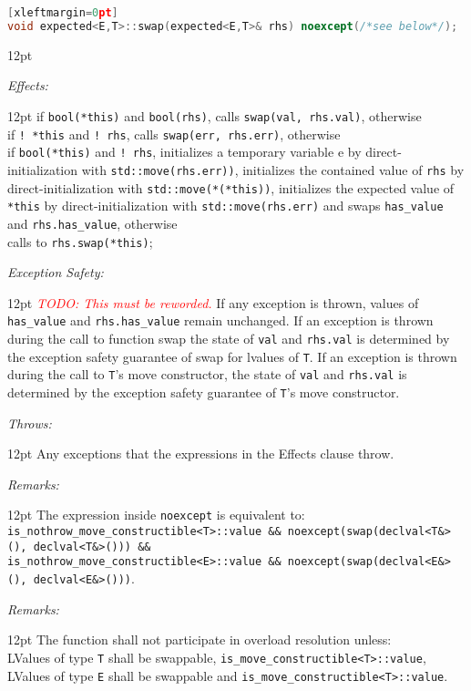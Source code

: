 \documentclass[a4paper,10pt]{article}
\newcommand{\cpp}[1]{\lstinline{#1}}
\newcommand{\todo}[1]{\emph{\textcolor{red}{TODO: #1}}}
\newcommand{\wordingItem}[1]{\noindent\textit{#1:}}
\newenvironment{wordingTextItem}[1]{\wordingItem{#1}\vspace{2pt}\noindent\begin{adjustwidth}{12pt}{}}{\vspace{2pt}\end{adjustwidth}}
\newenvironment{wordingPara}{\begin{adjustwidth}{12pt}{}}{\end{adjustwidth}}
\begin{document}
\begin{lstlisting}[language=C++][xleftmargin=0pt]
void expected<E,T>::swap(expected<E,T>& rhs) noexcept(/*see below*/); 
\end{lstlisting}
\begin{wordingPara}

\begin{wordingTextItem}{Effects}
if \cpp{bool(*this)} and \cpp{bool(rhs)}, calls \cpp{swap(val, rhs.val)}, otherwise \\
if \cpp{! *this} and \cpp{! rhs}, calls \cpp{swap(err, rhs.err)}, otherwise \\
if \cpp{bool(*this)} and \cpp{! rhs}, initializes a temporary variable e by direct-initialization with \cpp{std::move(rhs.err))}, initializes the contained value of \cpp{rhs} by direct-initialization with \cpp{std::move(*(*this))}, initializes the expected value of \cpp{*this} by direct-initialization with \cpp{std::move(rhs.err)} and swaps \cpp{has_value} and \cpp{rhs.has_value}, otherwise \\
calls to \cpp{rhs.swap(*this)};
\end{wordingTextItem}
\begin{wordingTextItem}{Exception Safety}
\todo{This must be reworded.}
If any exception is thrown, values of \cpp{has_value} and \cpp{rhs.has_value} remain unchanged. If an exception is thrown during the call to function swap the state of \cpp{val} and \cpp{rhs.val} is determined by the exception safety guarantee of swap for lvalues of \cpp{T}. If an exception is thrown during the call to \cpp{T}'s move constructor, the state of \cpp{val} and \cpp{rhs.val} is determined by the exception safety guarantee of \cpp{T}'s move constructor.
\end{wordingTextItem}
\begin{wordingTextItem}{Throws}
Any exceptions that the expressions in the Effects clause throw.
\end{wordingTextItem}
\begin{wordingTextItem}{Remarks}
The expression inside \cpp{noexcept} is equivalent to: \\
\cpp{is_nothrow_move_constructible<T>::value && noexcept(swap(declval<T&>(), declval<T&>())) &&} \\
\cpp{is_nothrow_move_constructible<E>::value && noexcept(swap(declval<E&>(), declval<E&>()))}.
\end{wordingTextItem}
\begin{wordingTextItem}{Remarks}
The function shall not participate in overload resolution unless: \\
LValues of type \cpp{T} shall be swappable, \cpp{is_move_constructible<T>::value}, LValues of type \cpp{E} shall be swappable and \cpp{is_move_constructible<T>::value}.
\end{wordingTextItem}
\end{wordingPara}
\end{document}
